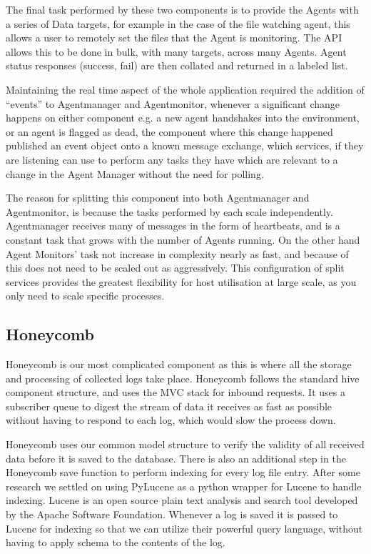 The final task performed by these two components is to provide the Agents with a
series of Data targets, for example in the case of the file watching agent, this
allows a user to remotely set the files that the Agent is monitoring. The API
allows this to be done in bulk, with many targets, across many Agents. Agent
status responses (success, fail) are then collated and returned in a labeled
list.

Maintaining the real time aspect of the whole application required the addition
of “events” to Agentmanager and Agentmonitor, whenever a significant change
happens on either component e.g. a new agent handshakes into the environment, or
an agent is flagged as dead, the component where this change happened published
an event object onto a known message exchange, which services, if they are
listening can use to perform any tasks they have which are relevant to a change
in the Agent Manager without the need for polling.

The reason for splitting this component into both Agentmanager and Agentmonitor,
is because the tasks performed by each scale independently. Agentmanager
receives many of messages in the form of heartbeats, and is a constant task that
grows with the number of Agents running. On the other hand Agent Monitors’ task
not increase in complexity nearly as fast, and because of this does not need to
be scaled out as aggressively. This configuration of split services provides the
greatest flexibility for host utilisation at large scale, as you only need to
scale specific processes.

\subsection{Honeycomb}

Honeycomb is our most complicated component as this is where all the storage and
processing of collected logs take place. Honeycomb follows the standard hive
component structure, and uses the MVC stack for inbound requests. It uses a
subscriber queue to digest the stream of data it receives as fast as possible
without having to respond to each log, which would slow the process down.

Honeycomb uses our common model structure to verify the validity of all received
data before it is saved to the database. There is also an additional step in the
Honeycomb save function to perform indexing for every log file entry. After some
research we settled on using PyLucene\cite{pylucene} as a python wrapper for
Lucene\cite{lucene} to
handle indexing. Lucene is an open source plain text analysis and search tool
developed by the Apache Software Foundation. Whenever a log is saved it is
passed to Lucene for indexing so that we can utilize their powerful query
language, without having to apply schema to the contents of the log.

